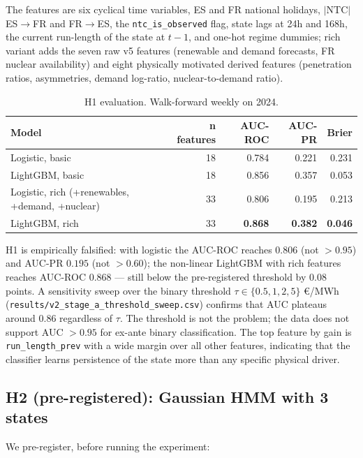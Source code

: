 \documentclass[11pt,a4paper]{article}
\begin{document}
The features are six cyclical time variables, ES and FR national
holidays, $|\mathrm{NTC}|$ ES$\to$FR and FR$\to$ES, the
\texttt{ntc\_is\_observed} flag, state lags at 24h and 168h, the
current run-length of the state at $t-1$, and one-hot regime
dummies; rich variant adds the seven raw v5 features
(renewable and demand forecasts, FR nuclear availability) and eight
physically motivated derived features (penetration ratios,
asymmetries, demand log-ratio, nuclear-to-demand ratio).

\begin{table}[H]
\centering
\small
\caption{H1 evaluation. Walk-forward weekly on 2024.}
\label{tab:h1}
\begin{tabular}{lrrrr}
\toprule
\textbf{Model} & \textbf{n features} & \textbf{AUC-ROC} &
\textbf{AUC-PR} & \textbf{Brier} \\
\midrule
Logistic, basic                & 18 & 0.784 & 0.221 & 0.231 \\
LightGBM, basic                & 18 & 0.856 & 0.357 & 0.053 \\
Logistic, rich (+renewables, +demand, +nuclear) & 33 & 0.806 & 0.195 & 0.213 \\
LightGBM, rich                                  & 33 & \textbf{0.868} & \textbf{0.382} & \textbf{0.046} \\
\bottomrule
\end{tabular}
\end{table}

H1 is empirically falsified: with logistic the AUC-ROC reaches
$0.806$ (not $> 0.95$) and AUC-PR $0.195$ (not $> 0.60$); the
non-linear LightGBM with rich features reaches AUC-ROC $0.868$ ---
still below the pre-registered threshold by $0.08$ points. A
sensitivity sweep over the binary threshold $\tau \in \{0.5, 1, 2, 5\}$
€/MWh (\texttt{results/v2\_stage\_a\_threshold\_sweep.csv}) confirms
that AUC plateaus around $0.86$ regardless of $\tau$. The threshold
is not the problem; the data does not support AUC $> 0.95$ for
ex-ante binary classification. The top feature by gain is
\texttt{run\_length\_prev} with a wide margin over all other
features, indicating that the classifier learns persistence of the
state more than any specific physical driver.

\subsection{H2 (pre-registered): Gaussian HMM with 3 states}\label{sec:h2}

We pre-register, before running the experiment:
\end{document}
